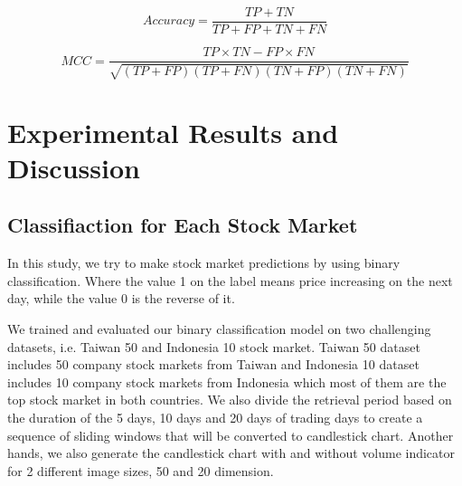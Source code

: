 \documentclass[10pt,twocolumn]{article}
\begin{document}
\begin{equation}
Accuracy=\frac{TP+TN}{TP+FP+TN+FN}
\end{equation}

\begin{equation}
MCC=\frac{TP\times TN-FP \times FN}{\sqrt{(TP+FP)(TP+FN)(TN+FP)(TN+FN)}}
\end{equation}

\section{Experimental Results and Discussion}
\subsection{Classifiaction for Each Stock Market}
In this study, we try to make stock market predictions by using binary classification. Where the value 1 on the label means price increasing on the next day, while the value 0 is the reverse of it.
\par
We trained and evaluated our binary classification model on two challenging datasets, i.e. Taiwan 50 and Indonesia 10 stock market. Taiwan 50 dataset includes 50 company stock markets from Taiwan and Indonesia 10 dataset includes 10 company stock markets from Indonesia which most of them are the top stock market in both countries. We also divide the retrieval period based on the duration of the 5 days, 10 days and 20 days of trading days to create a sequence of sliding windows that will be converted to candlestick chart. Another hands, we also generate the candlestick chart with and without volume indicator for 2 different image sizes, 50 and 20 dimension.
\end{document}
